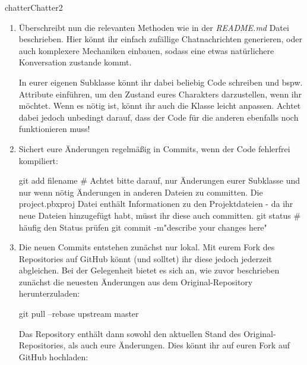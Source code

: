 \documentclass[parskip=half, final]{scrreprt}
\begin{document}
\begin{lecture}
\begin{exc}
\begin{excitem}{chatter}{Chatter}{2}
\begin{enumerate}[label=\roman*.]
Eure Aufgabe ist es nun, eine eigene Subklasse zu schreiben und sie mithilfe von Git den anderen zur Verfügung zu stellen! Ihr könnt bspw. versuchen, einen bekannten Charakter darzustellen, oder etwas völlig neues erschaffen. Lasst eurer Kreativität freien Lauf!

Erstellt dazu einfach eine neue Subklasse von  mit dem Namen eures Charakters und platziert die -Datei im Xcode Projekt Navigator unter .

\item Überschreibt nun die relevanten Methoden wie in der \emph{README.md} Datei beschrieben. Hier könnt ihr einfach zufällige Chatnachrichten generieren, oder auch komplexere Mechaniken einbauen, sodass eine etwas natürlichere Konversation zustande kommt.

In eurer eigenen Subklasse könnt ihr dabei beliebig Code schreiben und bspw. Attribute einführen, um den Zustand eures Charakters darzustellen, wenn ihr möchtet. Wenn es nötig ist, könnt ihr auch die  Klasse leicht anpassen. Achtet dabei jedoch unbedingt darauf, dass der Code für die anderen ebenfalls noch funktionieren muss!

\item Sichert eure Änderungen regelmäßig in Commits, wenn der Code fehlerfrei kompiliert:

\begin{shcode}
git add filename # Achtet bitte darauf, nur Änderungen eurer Subklasse und nur wenn nötig Änderungen in anderen Dateien zu committen. Die project.pbxproj Datei enthält Informationen zu den Projektdateien - da ihr neue Dateien hinzugefügt habt, müsst ihr diese auch committen.
git status # häufig den Status prüfen
git commit -m"describe your changes here"
\end{shcode}

\item Die neuen Commits entstehen zunächst nur lokal. Mit eurem Fork des Repositories auf GitHub könnt (und solltet) ihr diese jedoch jederzeit abgleichen. Bei der Gelegenheit bietet es sich an, wie zuvor beschrieben zunächst die neuesten Änderungen aus dem Original-Repository herunterzuladen:

\begin{shcode}
git pull --rebase upstream master
\end{shcode}

Das Repository enthält dann sowohl den aktuellen Stand des Original-Repositories, als auch eure Änderungen. Dies könnt ihr auf euren Fork auf GitHub hochladen:


\end{enumerate}
\end{excitem}
\end{exc}
\end{lecture}
\end{document}
